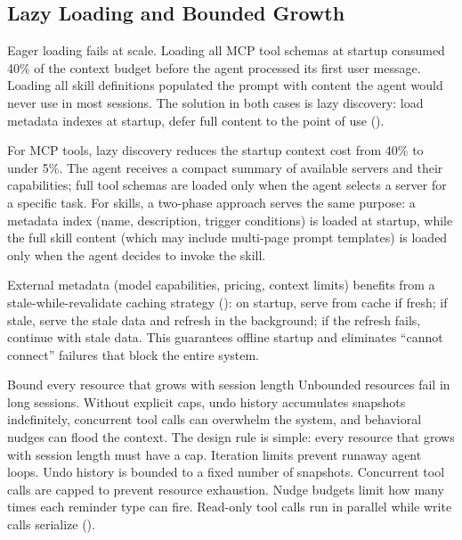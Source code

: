 \subsection{Lazy Loading and Bounded Growth}

Eager loading fails at scale. Loading all MCP tool schemas at startup consumed 40\% of the context budget before the agent processed its first user message. Loading all skill definitions populated the prompt with content the agent would never use in most sessions. The solution in both cases is lazy discovery: load metadata indexes at startup, defer full content to the point of use ().

For MCP tools, lazy discovery reduces the startup context cost from 40\% to under 5\%. The agent receives a compact summary of available servers and their capabilities; full tool schemas are loaded only when the agent selects a server for a specific task. For skills, a two-phase approach serves the same purpose: a metadata index (name, description, trigger conditions) is loaded at startup, while the full skill content (which may include multi-page prompt templates) is loaded only when the agent decides to invoke the skill.

External metadata (model capabilities, pricing, context limits) benefits from a stale-while-revalidate caching strategy (): on startup, serve from cache if fresh; if stale, serve the stale data and refresh in the background; if the refresh fails, continue with stale data. This guarantees offline startup and eliminates ``cannot connect'' failures that block the entire system.

\begin{lessonbox}{Bound every resource that grows with session length}
Unbounded resources fail in long sessions. Without explicit caps, undo history accumulates snapshots indefinitely, concurrent tool calls can overwhelm the system, and behavioral nudges can flood the context. The design rule is simple: every resource that grows with session length must have a cap. Iteration limits prevent runaway agent loops. Undo history is bounded to a fixed number of snapshots. Concurrent tool calls are capped to prevent resource exhaustion. Nudge budgets limit how many times each reminder type can fire. Read-only tool calls run in parallel while write calls serialize ().
\end{lessonbox}

